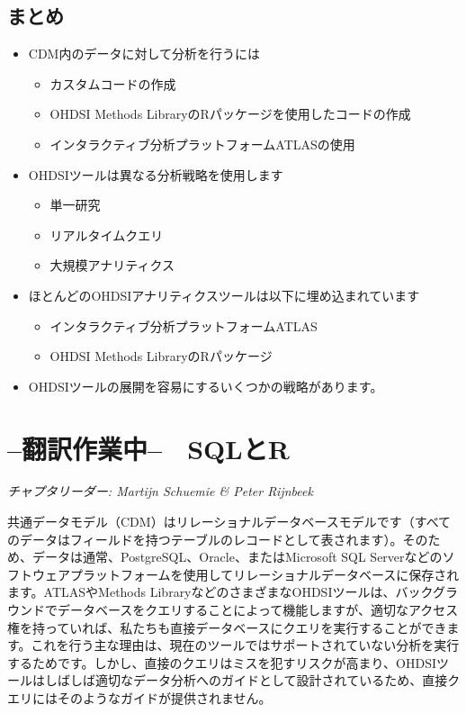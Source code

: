 \documentclass[
  11pt]{book}
\makeatletter
\providecommand{\tightlist}{%
  \setlength{\itemsep}{0pt}\setlength{\parskip}{0pt}}
\newenvironment{kframe}{%
\medskip{}
\setlength{\fboxsep}{.8em}
 \def\at@end@of@kframe{}%
 \ifinner\ifhmode%
  \def\at@end@of@kframe{\end{minipage}}%
  \begin{minipage}{\columnwidth}%
 \fi\fi%
 \def\FrameCommand##1{\hskip\@totalleftmargin \hskip-\fboxsep
 \colorbox{myShadeColor}{##1}\hskip-\fboxsep
     \hskip-\linewidth \hskip-\@totalleftmargin \hskip\columnwidth}%
 \MakeFramed {\advance\hsize-\width
   \@totalleftmargin\z@ \linewidth\hsize
   \@setminipage}}%
 {\par\unskip\endMakeFramed%
 \at@end@of@kframe}
\newenvironment{rmdblock}[1]
  {
  \begin{itemize}
  \renewcommand{\labelitemi}{
    \raisebox{-.7\height}[0pt][0pt]{
      {\setkeys{Gin}{width=3em,keepaspectratio}\texttt{[image: images/\#1]}}
    }
  }
  \setlength{\fboxsep}{1em}
  \begin{kframe}
  \item
  }
  {
  \end{kframe}
  \end{itemize}
  }
\newenvironment{rmdsummary}
  {\begin{rmdblock}{summary}}
  {\end{rmdblock}}
\theoremstyle{definition}
\theoremstyle{definition}
\theoremstyle{definition}
\theoremstyle{definition}
\theoremstyle{remark}
\makeatother
\begin{document}
\section{まとめ}\label{ux307eux3068ux3081-6}

\begin{rmdsummary}
\begin{itemize}
\tightlist
\item
  CDM内のデータに対して分析を行うには

  \begin{itemize}
  \tightlist
  \item
    カスタムコードの作成
  \item
    OHDSI Methods LibraryのRパッケージを使用したコードの作成
  \item
    インタラクティブ分析プラットフォームATLASの使用
  \end{itemize}
\item
  OHDSIツールは異なる分析戦略を使用します

  \begin{itemize}
  \tightlist
  \item
    単一研究
  \item
    リアルタイムクエリ
  \item
    大規模アナリティクス
  \end{itemize}
\item
  ほとんどのOHDSIアナリティクスツールは以下に埋め込まれています

  \begin{itemize}
  \tightlist
  \item
    インタラクティブ分析プラットフォームATLAS
  \item
    OHDSI Methods LibraryのRパッケージ
  \end{itemize}
\item
  OHDSIツールの展開を容易にするいくつかの戦略があります。
\end{itemize}
\end{rmdsummary}

\chapter{--翻訳作業中--　SQLとR}\label{SqlAndR}

\emph{チャプタリーダー: Martijn Schuemie \& Peter Rijnbeek}

共通データモデル（CDM）はリレーショナルデータベースモデルです（すべてのデータはフィールドを持つテーブルのレコードとして表されます）。そのため、データは通常、PostgreSQL、Oracle、またはMicrosoft SQL Serverなどのソフトウェアプラットフォームを使用してリレーショナルデータベースに保存されます。ATLASやMethods LibraryなどのさまざまなOHDSIツールは、バックグラウンドでデータベースをクエリすることによって機能しますが、適切なアクセス権を持っていれば、私たちも直接データベースにクエリを実行することができます。これを行う主な理由は、現在のツールではサポートされていない分析を実行するためです。しかし、直接のクエリはミスを犯すリスクが高まり、OHDSIツールはしばしば適切なデータ分析へのガイドとして設計されているため、直接クエリにはそのようなガイドが提供されません。
\end{document}
